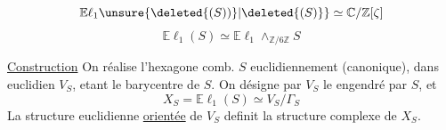 
\[
\mathbb E\ell_1\unsure{\deleted{(S))}|\deleted{(S)}}\simeq\mathbb C/\mathbb Z[\zeta]
\]
\[
\mathbb E\ell_1(S)\simeq\mathbb E\ell_1\mathbin{\wedge}_{\mathbb Z/6\mathbb Z}S
\]

\uline{Construction} On réalise l'hexagone comb. $S$ euclidiennement (canonique), dans  euclidien $V_S$,   etant le barycentre de $S$. On désigne par $V_S$ le   engendré par $S$, et
\[
X_S=\mathbb E\ell_1(S)\simeq V_S/\Gamma_S
\]
La structure euclidienne \uline{orientée} de $V_S$ definit la structure complexe de $X_S$.

